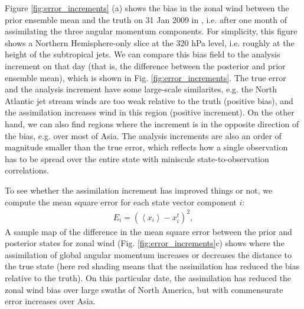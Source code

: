 Figure \ref{fig:error_increments} (a) shows the bias in the zonal wind between the prior ensemble mean and the truth on 31 Jan 2009 in \ERPALL, i.e. after one month of assimilating the three angular momentum components. 
For simplicity, this figure shows a Northern Hemisphere-only slice at the 320 hPa level, i.e. roughly at the height of the subtropical jets.
We can compare this bias field to the analysis increment on that day (that is, the difference between the posterior and prior ensemble mean), which is shown in Fig. \ref{fig:error_increments}.
The true error and the analysis increment have some large-scale similarites, e.g. the North Atlantic jet stream winds are too weak relative to the truth (positive bias), and the assimilation increases wind in this region (positive increment). 
On the other hand, we can also find regions where the increment is in the opposite direction of the bias, e.g. over most of Asia. 
The analysis increments are also an order of magnitude smaller than the true error, which reflects how a single observation has to be spread over the entire state with 
miniscule state-to-observation correlations.

To see whether the assimilation increment has improved things or not, we compute the mean square error for each state vector component $i$:
\begin{eqnarray}
	E_i = \left(
		\left< x_i \right>-x_{i}^{t}
	\right)^2,
\end{eqnarray}
A sample map of the difference in the mean square error between the prior and posterior states for zonal wind (Fig. \ref{fig:error_increments}c) shows where the assimilation of global angular momentum increases or decreases the distance to the true state (here red shading means that the assimilation has reduced the bias relative to the truth).  
On this particular date, the assimilation has reduced the zonal wind bias over large swaths of North America, but with commensurate error increases over Asia. 

